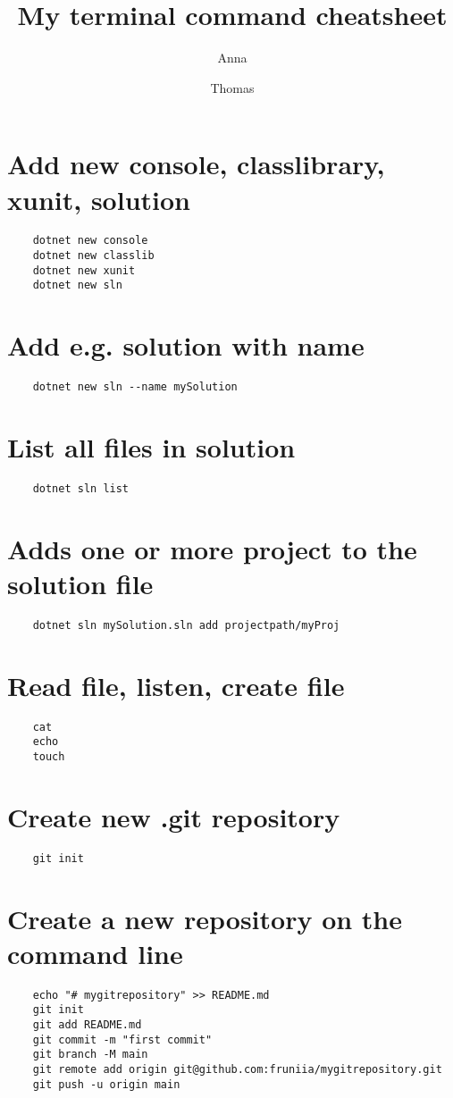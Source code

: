 \documentclass[10pt, a4paper]{article}
\title{My terminal command cheatsheet}
\author{Anna \and Thomas}
\begin{document}
\maketitle
\section*{Add new console, classlibrary, xunit, solution}
\begin{verbatim}
    dotnet new console
    dotnet new classlib
    dotnet new xunit
    dotnet new sln
\end{verbatim}
\section*{Add e.g. solution with name}
\begin{verbatim}
    dotnet new sln --name mySolution
\end{verbatim}
\section*{List all files in solution}
\begin{verbatim}
    dotnet sln list
\end{verbatim}
\section*{Adds one or more project to the solution file}
\begin{verbatim}
    dotnet sln mySolution.sln add projectpath/myProj
\end{verbatim}
\section*{Read file, listen, create file}
\begin{verbatim}
    cat 
    echo 
    touch
\end{verbatim}
\section*{Create new .git repository}
\begin{verbatim}
    git init
\end{verbatim}
\section*{Create a new repository on the command line}
\begin{verbatim}
    echo "# mygitrepository" >> README.md
    git init
    git add README.md
    git commit -m "first commit"
    git branch -M main
    git remote add origin git@github.com:fruniia/mygitrepository.git
    git push -u origin main
\end{verbatim}
\end{document}
